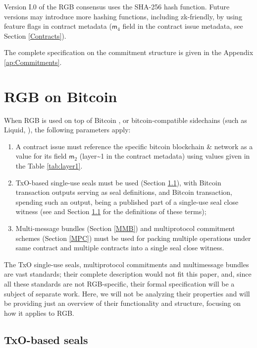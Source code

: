 \documentclass[9pt,oneside]{amsart}
\begin{document}
\begin{multicols}{2}
Version I.0 of the RGB consensus uses the SHA-256 hash function.
Future versions may introduce more hashing functions, including zk-friendly,
by using feature flags in contract metadata
($\mathsf{m}_4$ field in the contract issue metadata, see Section \ref{Contracts}).

The complete specification on the commitment structure is given in the Appendix \ref{ap:Commitments}.

\section{RGB on Bitcoin}

When RGB is used on top of Bitcoin \cite{Bitcoin},
or bitcoin-compatible sidechains (such as Liquid, \cite{Liquid}),
the following parameters apply:

\begin{enumerate}
\item A contract \gls{issue} must reference the specific bitcoin blockchain \& network
  as a value for its field $\mathsf{m}_2$ (\gls{layer~1} in the contract metadata)
  using values given in the Table \ref{tab:layer1}.
\item TxO-based single-use seals must be used (Section \ref{Seals}),
  with Bitcoin transaction outputs serving as seal definitions,
  and Bitcoin transaction, spending such an output,
  being a published part of a single-use \gls{seal close witness}
  (see \cite{LNPBP8} and Section \ref{Seals} for the definitions of these terms);
\item Multi-message bundles (Section \ref{MMB})
  and multiprotocol commitment schemes (Section \ref{MPC}) must be used for packing
  multiple operations under same contract and multiple contracts
  into a single \gls{seal close witness}.
\end{enumerate}

The TxO single-use seals, multiprotocol commitments and multimessage bundles are vast standards;
their complete description would not fit this paper, and,
since all these standards are not RGB-specific,
their formal specification will be a subject of separate work.
Here, we will not be analyzing their properties and will be providing just an overview
of their functionality and structure, focusing on how it applies to RGB.

\subsection{TxO-based seals}\label{Seals}


\end{multicols}
\end{document}
